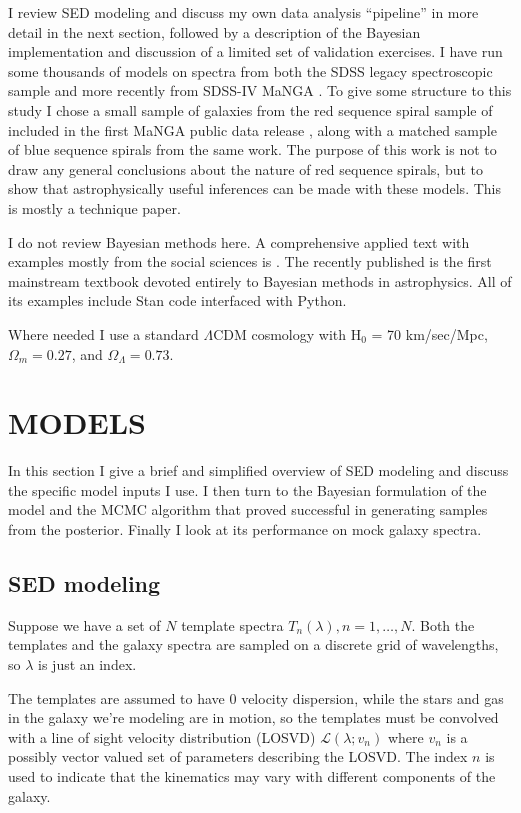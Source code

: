\documentclass[modern]{aastex62}
\begin{document}
I review SED modeling and discuss my own data analysis ``pipeline'' in more detail in the next section, followed by a description of the Bayesian implementation and discussion of a limited set of validation exercises. I have run some thousands of models on spectra from both the SDSS legacy spectroscopic sample \citep{2000AJ....120.1579Y} and more recently from SDSS-IV MaNGA \citep{2015AJ....150...19L}. To give some structure to this study I chose a small sample of galaxies from the red sequence spiral sample of \citet[][M10]{2010MNRAS.405..783M} included in the first MaNGA public data release \citep{2016arXiv160802013S}, along with a matched sample of blue sequence spirals from the same work. The purpose of this work is not to draw any general conclusions about the nature of red sequence spirals, but to show that astrophysically useful inferences can be made with these models. This is mostly a technique paper.

I do not review Bayesian methods here. A comprehensive applied text with examples mostly from the social sciences is \citet{bda3}. The recently published \citet{2017bmad.book.....H} is the first mainstream textbook devoted entirely to Bayesian methods in astrophysics. All of its examples include Stan code interfaced with Python.

Where needed I use a standard $\Lambda$CDM cosmology with H$_0$ = 70 km/sec/Mpc, $\Omega_m = 0.27$, and $\Omega_\Lambda = 0.73$.

\section{MODELS}
\label{sec:models}

In this section I give a brief and simplified overview of SED modeling and discuss the specific model inputs I use. I then turn to the Bayesian formulation of the model and the MCMC algorithm that proved successful in generating samples from the posterior. Finally I look at its performance on mock galaxy spectra.

\subsection{SED modeling}
\label{sec:ml}

Suppose we have a set of $N$ template spectra $T_n(\lambda), n = 1, \ldots, N$. Both the templates and the galaxy spectra are sampled on a discrete grid of wavelengths, so $\lambda$ is just an index.

The templates are assumed to have 0 velocity dispersion, while the stars and gas in the galaxy we're modeling are in motion, so the templates must be convolved with a line of sight velocity distribution (LOSVD) $\mathcal{L}(\lambda; v_n)$ where $v_n$ is a possibly vector valued set of parameters describing the LOSVD. The index $n$ is used to indicate that the kinematics may vary with different components of the galaxy.
\end{document}
